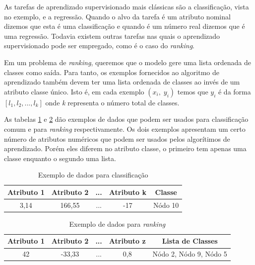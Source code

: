 As tarefas de aprendizado supervisionado mais clássicas são a classificação, vista no exemplo, e a regressão.
Quando o alvo da tarefa é um atributo nominal dizemos que esta é uma classificação e quando é um número real dizemos que é uma regressão.
Todavia existem outras tarefas nas quais o aprendizado supervisionado pode ser empregado, como é o caso do \textit{ranking}.

Em um problema de \textit{ranking}, queremos que o modelo gere uma lista ordenada de classes como saída.
Para tanto, os exemplos fornecidos ao algoritmo de aprendizado também devem ter uma lista ordenada de classes ao invés de um atributo classe único.
Isto é, em cada exemplo $ (x_i,\; y_i) $ temos que $y_i$ é da forma $ [l_1, l_2, ..., l_k] $ onde \textit{k} representa o número total de classes.

As tabelas \ref{tab:exdados1} e \ref{tab:exdados2} dão exemplos de dados que podem ser usados para classificação comum e para \textit{ranking} respectivamente.
Os dois exemplos apresentam um certo número de atributos numéricos que podem ser usados pelos algorítimos de aprendizado.
Porém eles diferem no atributo classe, o primeiro tem apenas uma classe enquanto o segundo uma lista.

\begin{table}[h!]
  \begin{center}
    \begin{tabular}{ccccc}
      \textbf{Atributo 1} & \textbf{Atributo 2} & ... & \textbf{Atributo k} & \textbf{Classe} \\
      \hline

      3,14 & 166,55 & ... & -17 & Nódo 10 \\

    \end{tabular}
    \caption{Exemplo de dados para classificação}
    \label{tab:exdados1}
  \end{center}
\end{table}

\begin{table}[h!]
  \begin{center}
    \begin{tabular}{ccccc}
      \textbf{Atributo 1} & \textbf{Atributo 2} & ... & \textbf{Atributo z} & \textbf{Lista de Classes} \\
      \hline

      42 & -33,33 & ... & 0,8 & Nódo 2, Nódo 9, Nódo 5 \\

    \end{tabular}
    \caption{Exemplo de dados para \textit{ranking}}
    \label{tab:exdados2}
  \end{center}
\end{table}

